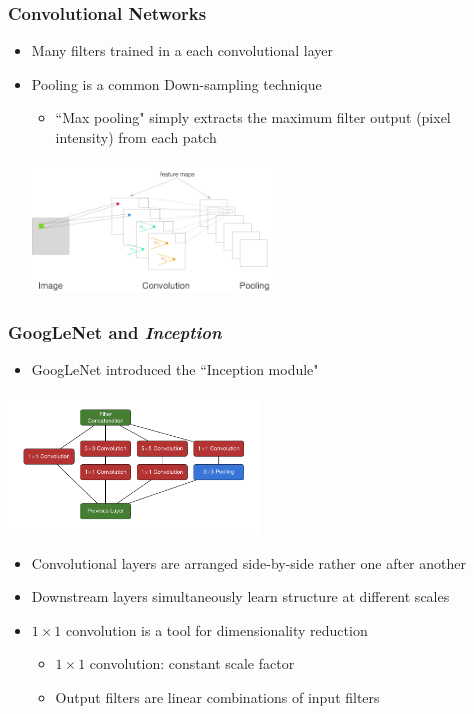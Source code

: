\documentclass[10pt,professionalfonts,xcolor=table]{beamer}
\begin{document}
\begin{frame}
\frametitle{Convolutional Networks}
\begin{itemize}
  \item Many filters trained in a each convolutional layer
  \gap
  \item Pooling is a common Down-sampling technique
    \begin{itemize}
    \item ``Max pooling" simply extracts the maximum filter output (pixel intensity) from each patch
    \end{itemize}

  \begin{center}
 \includegraphics[width=0.5\textwidth]{figures/figures/convnet.png}
 \end{center}

\end{itemize}


\end{frame}

\begin{frame}
\frametitle{GoogLeNet and \textit{Inception}}

  \begin{itemize}
  \item GoogLeNet introduced the ``Inception module"
  \end{itemize}
  \begin{center}
 \includegraphics[width=0.5\textwidth]{figures/figures/inception/inception.pdf}
 \end{center}
   \begin{itemize}
  \gap
  \item Convolutional layers are arranged side-by-side rather one after another
  \item Downstream layers simultaneously learn structure at different scales
  \item $1\times1$ convolution is a tool for dimensionality reduction
    \begin{itemize}
    \item $1\times1$ convolution: constant scale factor
    \item Output filters are linear combinations of input filters
    \end{itemize}
  \end{itemize}

\end{frame}
\end{document}
